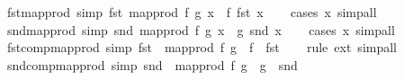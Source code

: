\begin{isabellebody}
\endisatagproof
{\isafoldproof}%
%
\isadelimproof
\isanewline
%
\endisadelimproof
\isanewline
{}\isamarkupfalse%
\ fst{\isacharunderscore}{\kern0pt}map{\isacharunderscore}{\kern0pt}prod\ {\isacharbrackleft}{\kern0pt}simp{\isacharbrackright}{\kern0pt}{\isacharcolon}{\kern0pt}\ {\isachardoublequoteopen}fst\ {\isacharparenleft}{\kern0pt}map{\isacharunderscore}{\kern0pt}prod\ f\ g\ x{\isacharparenright}{\kern0pt}\ {\isacharequal}{\kern0pt}\ f\ {\isacharparenleft}{\kern0pt}fst\ x{\isacharparenright}{\kern0pt}{\isachardoublequoteclose}\isanewline
%
\isadelimproof
\ \ %
\endisadelimproof
%
\isatagproof
{}\isamarkupfalse%
\ {\isacharparenleft}{\kern0pt}cases\ x{\isacharparenright}{\kern0pt}\ simp{\isacharunderscore}{\kern0pt}all%
\endisatagproof
{\isafoldproof}%
%
\isadelimproof
\isanewline
%
\endisadelimproof
\isanewline
{}\isamarkupfalse%
\ snd{\isacharunderscore}{\kern0pt}map{\isacharunderscore}{\kern0pt}prod\ {\isacharbrackleft}{\kern0pt}simp{\isacharbrackright}{\kern0pt}{\isacharcolon}{\kern0pt}\ {\isachardoublequoteopen}snd\ {\isacharparenleft}{\kern0pt}map{\isacharunderscore}{\kern0pt}prod\ f\ g\ x{\isacharparenright}{\kern0pt}\ {\isacharequal}{\kern0pt}\ g\ {\isacharparenleft}{\kern0pt}snd\ x{\isacharparenright}{\kern0pt}{\isachardoublequoteclose}\isanewline
%
\isadelimproof
\ \ %
\endisadelimproof
%
\isatagproof
{}\isamarkupfalse%
\ {\isacharparenleft}{\kern0pt}cases\ x{\isacharparenright}{\kern0pt}\ simp{\isacharunderscore}{\kern0pt}all%
\endisatagproof
{\isafoldproof}%
%
\isadelimproof
\isanewline
%
\endisadelimproof
\isanewline
{}\isamarkupfalse%
\ fst{\isacharunderscore}{\kern0pt}comp{\isacharunderscore}{\kern0pt}map{\isacharunderscore}{\kern0pt}prod\ {\isacharbrackleft}{\kern0pt}simp{\isacharbrackright}{\kern0pt}{\isacharcolon}{\kern0pt}\ {\isachardoublequoteopen}fst\ {\isasymcirc}\ map{\isacharunderscore}{\kern0pt}prod\ f\ g\ {\isacharequal}{\kern0pt}\ f\ {\isasymcirc}\ fst{\isachardoublequoteclose}\isanewline
%
\isadelimproof
\ \ %
\endisadelimproof
%
\isatagproof
{}\isamarkupfalse%
\ {\isacharparenleft}{\kern0pt}rule\ ext{\isacharparenright}{\kern0pt}\ simp{\isacharunderscore}{\kern0pt}all%
\endisatagproof
{\isafoldproof}%
%
\isadelimproof
\isanewline
%
\endisadelimproof
\isanewline
{}\isamarkupfalse%
\ snd{\isacharunderscore}{\kern0pt}comp{\isacharunderscore}{\kern0pt}map{\isacharunderscore}{\kern0pt}prod\ {\isacharbrackleft}{\kern0pt}simp{\isacharbrackright}{\kern0pt}{\isacharcolon}{\kern0pt}\ {\isachardoublequoteopen}snd\ {\isasymcirc}\ map{\isacharunderscore}{\kern0pt}prod\ f\ g\ {\isacharequal}{\kern0pt}\ g\ {\isasymcirc}\ snd{\isachardoublequoteclose}\isanewline

\end{isabellebody}

